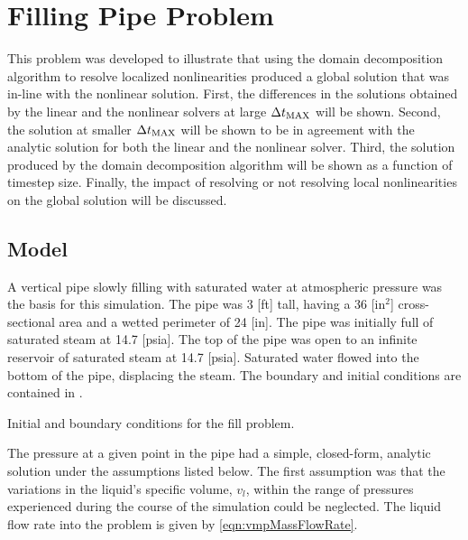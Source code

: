 
\section{Filling Pipe Problem}
\label{sect:vmp}
This problem was developed to illustrate that using the domain decomposition algorithm to resolve localized nonlinearities produced a global solution that was in-line with the nonlinear solution.
First, the differences in the solutions obtained by the linear and the nonlinear solvers at large $\dtmax{}$ will be shown.
Second, the solution at smaller $\dtmax{}$ will be shown to be in agreement with the analytic solution for both the linear and the nonlinear solver.
Third, the solution produced by the domain decomposition algorithm will be shown as a function of timestep size.
Finally, the impact of resolving or not resolving local nonlinearities on the global solution will be discussed.

\subsection{Model}
\label{subsect:vmpModel}

A vertical pipe slowly filling with saturated water at atmospheric pressure was the basis for this simulation.
The pipe was 3 [ft] tall, having a 36 [in$^{2}$] cross-sectional area and a wetted perimeter of 24 [in].
The pipe was initially full of saturated steam at 14.7 [psia].
The top of the pipe was open to an infinite reservoir of saturated steam at 14.7 [psia].
Saturated water flowed into the bottom of the pipe, displacing the steam.
The boundary and initial conditions are contained in .

\begin{table}[h!tb]
\centering
\singlespace

\caption{Initial and boundary conditions for the fill problem.}
\label{tab:vmpBCIC}
\end{table}

The pressure at a given point in the pipe had a simple, closed-form, analytic solution under the assumptions listed below.
The first assumption was that the variations in the liquid's specific volume, $v_{l}$, within the range of pressures experienced during the course of the simulation could be neglected.
The liquid flow rate into the problem is given by \eqref{eqn:vmpMassFlowRate}.

